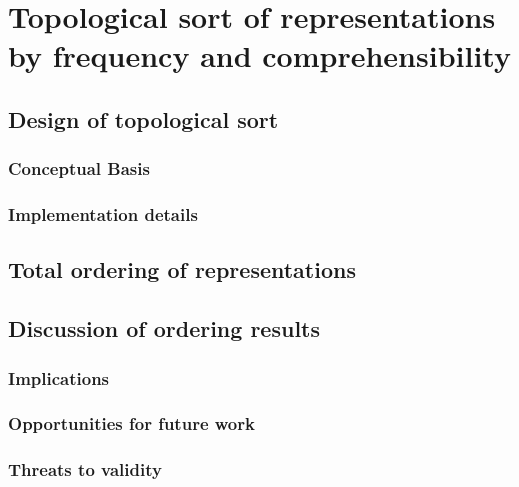 \chapter{Topological sort of representations by frequency and comprehensibility}
\section{Design of topological sort}

\subsection{Conceptual Basis}
\subsection{Implementation details}

\section{Total ordering of representations}

\section{Discussion of ordering results}
\subsection{Implications}
\subsection{Opportunities for future work}
\subsection{Threats to validity}
